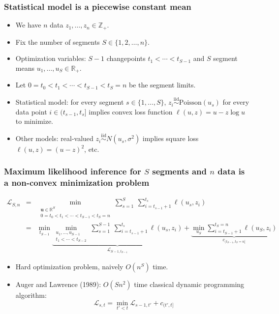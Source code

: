 \documentclass{beamer}
\newcommand{\RR}{\mathbb R}
\newcommand{\ZZ}{\mathbb Z}
\begin{document}
\begin{frame}
  \frametitle{Statistical model is a piecewise constant mean}

  
  \vskip -0.8cm    
  \begin{itemize}
  \item We have $n$ data $z_1, \dots, z_n\in\ZZ_+$.
  \item Fix the number of segments $S\in\{1, 2, \dots, n\}$.
  \item Optimization variables: $S-1$ changepoints
    $t_1 < \cdots < t_{S-1}$ and $S$ segment means $u_1,\dots,u_S\in\RR_+$.
  \item Let $0=t_0<t_1 < \cdots < t_{S-1}<t_S=n$ be the segment
    limits.
  \item Statistical model: for every segment $s\in\{1,\dots,S\}$,
    $z_i \stackrel{\text{iid}}{\sim} \text{Poisson}(u_s)$ for every
    data point $i\in(t_{s-1},t_s]$ implies convex loss function
    $\ell(u, z)=u-z\log u$ to minimize.
  \item Other models: real-valued
    $z_i\stackrel{\text{iid}}{\sim} N(u_s, \sigma^2)$ implies square
    loss $\ell(u, z)=(u-z)^2$, etc.
  \end{itemize}
\end{frame}

\begin{frame}
  \frametitle{Maximum likelihood inference for $S$ segments and $n$
    data is a non-convex minimization problem}
    
\vskip -1.4cm
\begin{eqnarray*}
  \mathcal L_{S,n} &=& \min_{\substack{
  \mathbf u\in\RR^{S}
\\
   0=t_0<t_1<\cdots<t_{S-1}<t_S=n
  }} 
    \sum_{s=1}^S\  \sum_{i=t_{s-1}+1}^{t_s} \ell( u_s,  z_i) 
\\
&=&\min_{t_{S-1}}\underbrace{
\min_{\substack{
u_1,\dots,u_{S-1}\\
t_1<\cdots<t_{S-2}
}}
  \sum_{s=1}^{S-1}\  \sum_{i=t_{s-1}+1}^{t_s} \ell( u_s,  z_i)
}_{
\mathcal L_{S-1, t_{S-1}}
} +
\underbrace{\min_{u_S} \sum_{i=t_{S-1}+1}^{t_S=n} \ell( u_S,  z_i)}_{
c_{(t_{S-1}, t_S=n]}
}
\end{eqnarray*}
\vskip -0.4cm
\begin{itemize}  
\item Hard optimization problem, naively $O(n^S)$ time.
\item Auger and Lawrence (1989): $O(Sn^2)$ time classical dynamic
  programming algorithm:
$$
\mathcal L_{s,t}=\min_{t'<t} \mathcal L_{s-1,t'} + c_{(t', t]}
$$
\end{itemize}
\end{frame} 
\end{document}
